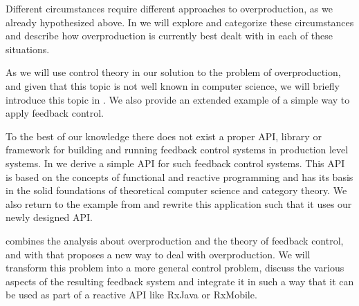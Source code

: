 Different circumstances require different approaches to overproduction, as we already hypothesized above. In  we will explore and categorize these circumstances and describe how overproduction is currently best dealt with in each of these situations.

As we will use control theory in our solution to the problem of overproduction, and given that this topic is not well known in computer science, we will briefly introduce this topic in . We also provide an extended example of a simple way to apply feedback control.

To the best of our knowledge there does not exist a proper API, library or framework for building and running feedback control systems in production level systems. In  we derive a simple API for such feedback control systems. This API is based on the concepts of functional and reactive programming and has its basis in the solid foundations of theoretical computer science and category theory. We also return to the example from  and rewrite this application such that it uses our newly designed API.

 combines the analysis about overproduction and the theory of feedback control, and with that proposes a new way to deal with overproduction. We will transform this problem into a more general control problem, discuss the various aspects of the resulting feedback system and integrate it in such a way that it can be used as part of a reactive API like RxJava or RxMobile.
